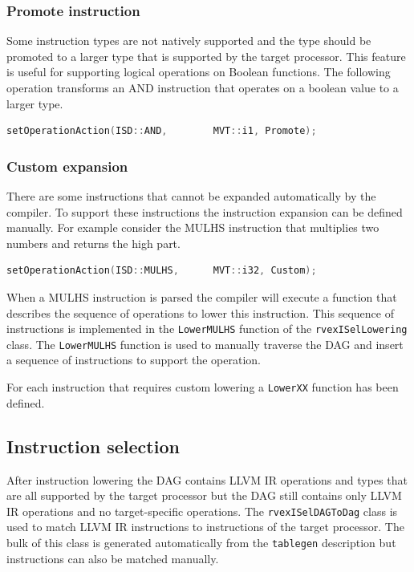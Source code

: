 \subsubsection{Promote instruction}
Some instruction types are not natively supported and the type should be promoted to a larger type that is supported by the target processor. This feature is useful for supporting logical operations on Boolean functions. The following operation transforms an AND instruction that operates on a boolean value to a larger type.

\begin{lstlisting}[language=c] 
setOperationAction(ISD::AND,        MVT::i1, Promote);
\end{lstlisting}

\subsubsection{Custom expansion}
There are some instructions that cannot be expanded automatically by the compiler. To support these instructions the instruction expansion can be defined manually. For example consider the MULHS instruction that multiplies two numbers and returns the high part.

\begin{lstlisting}[language=c] 
setOperationAction(ISD::MULHS,      MVT::i32, Custom);
\end{lstlisting}

When a MULHS instruction is parsed the compiler will execute a function that describes the sequence of operations to lower this instruction. This sequence of instructions is implemented in the \texttt{LowerMULHS} function of the \texttt{rvexISelLowering} class. The \texttt{LowerMULHS} function is used to manually traverse the DAG and insert a sequence of instructions to support the operation.

For each instruction that requires custom lowering a \texttt{LowerXX} function has been defined.

\subsection{Instruction selection}
After instruction lowering the DAG contains LLVM IR operations and types that are all supported by the target processor but the DAG still contains only LLVM IR operations and no target-specific operations. The \texttt{rvexISelDAGToDag} class is used to match LLVM IR instructions to instructions of the target processor. The bulk of this class is generated automatically from the \texttt{tablegen} description but instructions can also be matched manually.

